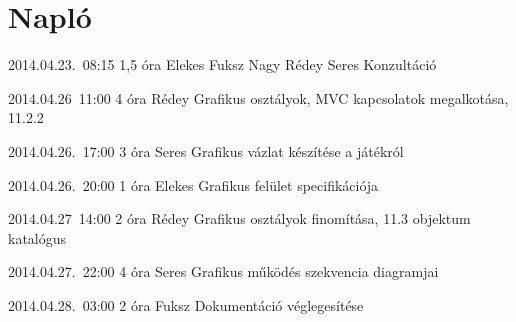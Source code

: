 %
\section{Napló}

\begin{naplo}

\bejegyzes
{2014.04.23.~08:15}
{1,5 óra}
{Elekes\newline
Fuksz\newline
Nagy\newline
Rédey\newline
Seres}
{Konzultáció}

\bejegyzes
{2014.04.26~11:00}
{4 óra}
{Rédey}
{Grafikus osztályok, MVC kapcsolatok megalkotása, 11.2.2}

\bejegyzes
{2014.04.26.~17:00}
{3 óra}
{Seres}
{Grafikus vázlat készítése a játékról}

\bejegyzes
{2014.04.26.~20:00}
{1 óra}
{Elekes}
{Grafikus felület specifikációja}

\bejegyzes
{2014.04.27~14:00}
{2 óra}
{Rédey}
{Grafikus osztályok finomítása, 11.3 objektum katalógus}

\bejegyzes
{2014.04.27.~22:00}
{4 óra}
{Seres}
{Grafikus működés szekvencia diagramjai}

\bejegyzes
{2014.04.28.~03:00}
{2 óra}
{Fuksz}
{Dokumentáció véglegesítése}


\end{naplo}

